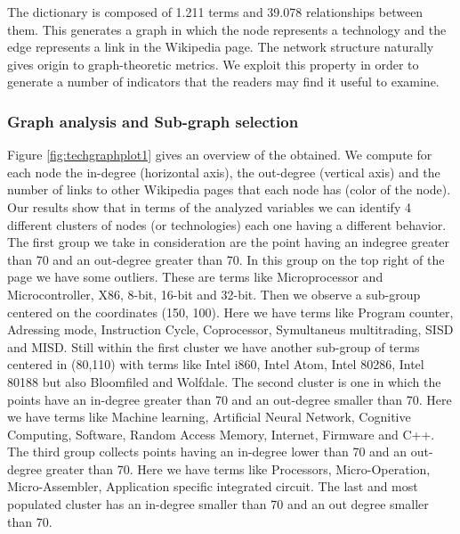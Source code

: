 \documentclass[]{book}
\theoremstyle{definition}
\theoremstyle{definition}
\theoremstyle{definition}
\theoremstyle{remark}
\begin{document}
The dictionary is composed of 1.211 terms and 39.078 relationships
between them. This generates a graph in which the node represents a
technology and the edge represents a link in the Wikipedia page. The
network structure naturally gives origin to graph-theoretic metrics. We
exploit this property in order to generate a number of indicators that
the readers may find it useful to examine.

\subsubsection*{Graph analysis and Sub-graph
selection}\label{graph-analysis-and-sub-graph-selection}

Figure \ref{fig:techgraphplot1} gives an overview of the obtained. We
compute for each node the in-degree (horizontal axis), the out-degree
(vertical axis) and the number of links to other Wikipedia pages that
each node has (color of the node). Our results show that in terms of the
analyzed variables we can identify 4 different clusters of nodes (or
technologies) each one having a different behavior. The first group we
take in consideration are the point having an indegree greater than 70
and an out-degree greater than 70. In this group on the top right of the
page we have some outliers. These are terms like Microprocessor and
Microcontroller, X86, 8-bit, 16-bit and 32-bit. Then we observe a
sub-group centered on the coordinates (150, 100). Here we have terms
like Program counter, Adressing mode, Instruction Cycle, Coprocessor,
Symultaneus multitrading, SISD and MISD. Still within the first cluster
we have another sub-group of terms centered in (80,110) with terms like
Intel i860, Intel Atom, Intel 80286, Intel 80188 but also Bloomfiled and
Wolfdale. The second cluster is one in which the points have an
in-degree greater than 70 and an out-degree smaller than 70. Here we
have terms like Machine learning, Artificial Neural Network, Cognitive
Computing, Software, Random Access Memory, Internet, Firmware and C++.
The third group collects points having an in-degree lower than 70 and an
out-degree greater than 70. Here we have terms like Processors,
Micro-Operation, Micro-Assembler, Application specific integrated
circuit. The last and most populated cluster has an in-degree smaller
than 70 and an out degree smaller than 70.
\end{document}
